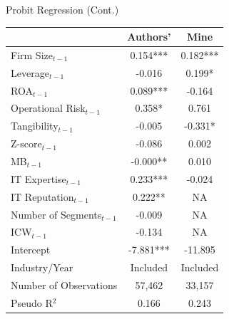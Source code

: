 \documentclass[13pt]{beamer}
\begin{document}
\begin{frame}
  {Probit Regression (Cont.)}
  \scriptsize
  \begin{table}[ht]
    \centering
    \begin{tabular}{@{}lcc@{}}
      \toprule
                                 & Authors'  & Mine     \\
      \midrule
      Firm Size$_{t-1}$          & 0.154***  & 0.182*** \\
      Leverage$_{t-1}$           & -0.016    & 0.199*   \\
      ROA$_{t-1}$                & 0.089***  & -0.164   \\
      Operational Risk$_{t-1}$   & 0.358*    & 0.761    \\
      Tangibility$_{t-1}$        & -0.005    & -0.331*  \\
      Z-score$_{t-1}$            & -0.086    & 0.002    \\
      MB$_{t-1}$                 & -0.000**  & 0.010    \\
      IT Expertise$_{t-1}$       & 0.233***  & -0.024   \\
      IT Reputation$_{t-1}$      & 0.222**   & NA       \\
      Number of Segments$_{t-1}$ & -0.009    & NA       \\
      ICW$_{t-1}$                & -0.134    & NA       \\
      Intercept                  & -7.881*** & -11.895  \\
      \midrule
      Industry/Year              & Included  & Included \\
      Number of Observations     & 57,462    & 33,157   \\
      Pseudo R$^2$               & 0.166     & 0.243    \\
      \bottomrule
    \end{tabular}
  \end{table}

\end{frame}
\end{document}
